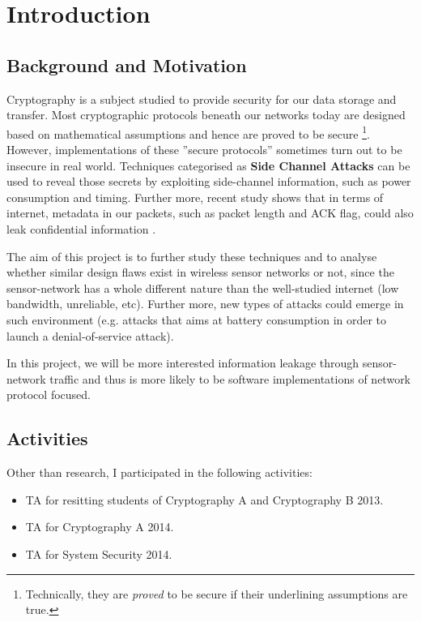 \section{Introduction}

\subsection{Background and Motivation}  

Cryptography is a subject studied to provide security for our data storage and transfer. Most cryptographic protocols beneath our networks today are designed based on mathematical assumptions and hence are proved to be secure
\footnote{Technically, they are \textit{proved} to be secure if their underlining assumptions are true.}. However, implementations of these ''secure protocols'' sometimes turn out to be insecure in real world. Techniques categorised as \textbf{Side Channel Attacks} can be used to reveal those secrets by exploiting side-channel information, such as power consumption\cite{DPA} and timing\cite{Cache-Timing1}. Further more, recent study shows that in terms of internet,  metadata in our packets, such as packet length and ACK flag, could also leak confidential information \cite{Web1} \cite{Web2}.

The aim of this project is to further study these techniques and to analyse whether similar design flaws exist in wireless sensor networks or not, since the sensor-network has a whole different nature than the well-studied internet (low bandwidth, unreliable, etc). Further more, new types of attacks could emerge in such environment (e.g. attacks that aims at battery consumption in order to launch a denial-of-service attack).

In this project, we will be more interested information leakage through sensor-network traffic and thus is more likely to be software implementations of network protocol focused.

\subsection{Activities}

Other than research, I participated in the following activities:
\begin{itemize}
\item TA for resitting students of Cryptography A and Cryptography B 2013.
\item TA for Cryptography A 2014.
\item TA for System Security 2014.
\end{itemize}

